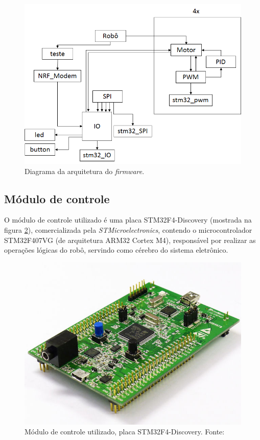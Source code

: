 \documentclass[conference]{IEEEtran}
\begin{document}
\begin{figure}[thpb]	
	\centering
	\includegraphics[width=\linewidth]{img/fluxograma_controle}
	\caption{Diagrama da arquitetura do \textit{firmware}.}
	\label{img:diagrama}
\end{figure}

\subsection{Módulo de controle}

O módulo de controle utilizado é uma placa STM32F4-Discovery (mostrada na figura \ref{img:modulocontrole}), comercializada pela \textit{STMicroelectronics}, contendo o microcontrolador STM32F407VG (de arquitetura ARM32 Cortex M4), responsável por realizar as operações lógicas do robô, servindo como cérebro do sistema eletrônico.


\begin{figure}[thpb]	
	\centering
	\includegraphics[width=\linewidth]{img/modulocontrole}
	\caption{Módulo de controle utilizado, placa STM32F4-Discovery. Fonte: \cite{omni}}
	\label{img:modulocontrole}
\end{figure}
\end{document}
